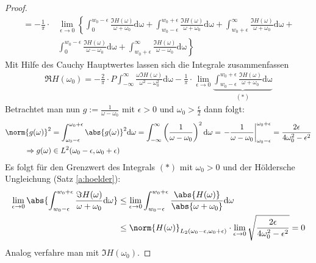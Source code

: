 \begin{satz}
\begin{proof}
\begin{align}
		=-\frac{1}{\pi} \cdot &\lim_{\epsilon \rightarrow 0} \left\{ \int_{0}^{w_0-\epsilon} \frac{\Im{H(\omega)}}{\omega+\omega_0} \mathrm{d\omega} + \int_{w_0-\epsilon}^{w_0+\epsilon} \frac{\Im{H(\omega)}}{\omega+\omega_0} \mathrm{d\omega} + \int_{w_0+\epsilon}^{\infty} \frac{\Im{H(\omega)}}{\omega+\omega_0} \mathrm{d\omega} + \right. \\
		&\left. \int_{0}^{w_0-\epsilon} \frac{\Im{H(\omega)}}{\omega-\omega_0} \mathrm{d\omega} + \int_{w_0 + \epsilon}^{\infty} \frac{\Im{H(\omega)}}{\omega-\omega_0} \mathrm{d\omega} \right\}
\end{align}
Mit Hilfe des Cauchy Hauptwertes lassen sich die Integrale zusammenfassen
\begin{align}
\Re{H(\omega_0)} = -\frac{2}{\pi}\cdot P \int_{-\infty}^{\infty} \frac{\omega \Im{H(\omega)}}{\omega^2-\omega_0^2} \mathrm{d\omega} - \frac{1}{\pi} \cdot \lim_{\epsilon \rightarrow 0}\underbrace{\int_{w_0-\epsilon}^{w_0+\epsilon} \frac{\Im{H(\omega)}}{\omega+\omega_0} \mathrm{d\omega}}_{(*)}
\end{align}
Betrachtet man nun $g:=\frac{1}{\omega - \omega_0}$ mit $\epsilon > 0$ und $\omega_0 > \frac{\epsilon}{2}$ dann folgt: 
\begin{align}
	\norm{g(\omega)}^2 &= \int_{\omega_0 -\epsilon}^{\omega_0 + \epsilon} \abs{g(\omega)}^2 \mathrm{d\omega} = \int_{-\infty}^{\infty} \left(\frac{1}{\omega - \omega_0}\right)^2 \mathrm{d\omega} =  \left.- \frac{1}{\omega - \omega_0} \right\vert_{\omega_0 - \epsilon}^{\omega_0 + \epsilon} = \frac{2 \epsilon}{4 \omega_0^2 - \epsilon^2 }\\
	\Rightarrow g(\omega) &\in L^2(\omega_0 - \epsilon, \omega_0 + \epsilon)
\end{align}
Es folgt für den Grenzwert des Integrals $(*)$ mit $\omega_0 > 0$ und der Höldersche Ungleichung (Satz \ref{a:hoelder}):
\begin{align}
\lim_{\epsilon \rightarrow 0}\abs{\int_{w_0-\epsilon}^{w_0+\epsilon} \frac{\Im{H(\omega)}}{\omega+\omega_0} \mathrm{d\omega}} &\leq \lim_{\epsilon \rightarrow 0}\int_{w_0-\epsilon}^{w_0+\epsilon} \frac{\abs{H(\omega)}}{\abs{\omega+\omega_0}} \mathrm{d\omega} \\
&\leq \norm{H(\omega)}_{L_2(\omega_0 - \epsilon, \omega_0 + \epsilon)} \cdot \lim_{\epsilon \rightarrow 0} \sqrt{\frac{2 \epsilon}{4 \omega_0^2 - \epsilon^2 }} = 0
\end{align}
Analog verfahre man mit $\Im{H(\omega_0)}$.
\end{proof}
\end{satz}
